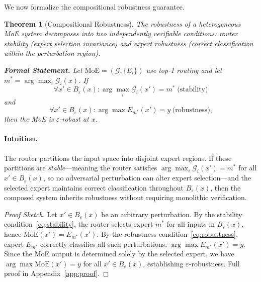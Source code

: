 \documentclass{article}
\theoremstyle{plain}
\newtheorem{theorem}{Theorem}[section]
\theoremstyle{remark}
\begin{document}
We now formalize the compositional robustness guarantee.

\begin{theorem}[Compositional Robustness]
\label{thm:compositional}
The robustness of a heterogeneous MoE system decomposes into two independently verifiable conditions: router stability (expert selection invariance) and expert robustness (correct classification within the perturbation region).

\smallskip
\noindent\textbf{Formal Statement.} Let $\mathrm{MoE} = (\mathcal{G}, \{E_i\})$ use top-1 routing and let
$m^* = \arg\max_i \mathcal{G}_i(x)$.
If
\begin{equation}
\label{eq:stability}
\forall x' \in B_\varepsilon(x): \arg\max_i \mathcal{G}_i(x') = m^* \;\text{(stability)}
\end{equation}
and
\begin{equation}
\label{eq:robustness}
\forall x' \in B_\varepsilon(x): \arg\max E_{m^*}(x') = y \;\text{(robustness),}
\end{equation}
then the MoE is $\varepsilon$-robust at $x$.
\end{theorem}

\paragraph{Intuition.}
The router partitions the input space into disjoint expert regions. If these partitions are \textit{stable}---meaning the router satisfies $\arg\max_i \mathcal{G}_i(x') = m^*$ for all $x' \in B_\varepsilon(x)$, so no adversarial perturbation can alter expert selection---and the selected expert maintains correct classification throughout $B_\varepsilon(x)$, then the composed system inherits robustness without requiring monolithic verification.

\begin{proof}[Proof Sketch]
Let $x' \in B_\varepsilon(x)$ be an arbitrary perturbation. By the stability condition~\eqref{eq:stability}, the router selects expert $m^*$ for all inputs in $B_\varepsilon(x)$, hence $\mathrm{MoE}(x') = E_{m^*}(x')$. By the robustness condition~\eqref{eq:robustness}, expert $E_{m^*}$ correctly classifies all such perturbations: $\arg\max E_{m^*}(x') = y$. Since the MoE output is determined solely by the selected expert, we have $\arg\max \mathrm{MoE}(x') = y$ for all $x' \in B_\varepsilon(x)$, establishing $\varepsilon$-robustness. Full proof in Appendix~\ref{app:proof}.
\end{proof}
\end{document}
